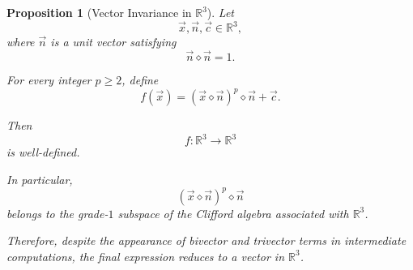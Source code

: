 \documentclass{amsart}
\theoremstyle{plain}
\newtheorem{proposition}{Proposition}
\numberwithin{equation}{section}
\begin{document}
\begin{proposition}[Vector Invariance in $\mathbb{R}^{3}$]
Let
\[
\vec{x},\vec{n},\vec{c}\in \mathbb{R}^{3},
\]
where $\vec n$ is a unit vector satisfying
\[
\vec n\diamond \vec n =1.
\]

For every integer $p\ge 2$, define
\[
f(\vec{x})
=
(\vec{x}\diamond \vec n)^p\diamond \vec n+\vec c.
\]

Then
\[
f:\mathbb{R}^{3}\to \mathbb{R}^{3}
\]
is well-defined.

In particular,
\[
(\vec{x}\diamond \vec n)^p\diamond \vec n
\]
belongs to the grade-$1$ subspace of the Clifford algebra associated
with $\mathbb{R}^{3}$.

Therefore, despite the appearance of bivector and trivector terms in
intermediate computations, the final expression reduces to a vector in
$\mathbb{R}^{3}$.
\end{proposition}
\end{document}

